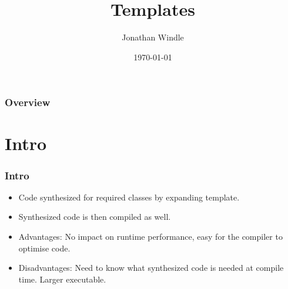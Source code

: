 \documentclass{beamer}
\title[Templates]{Templates} %
\author{Jonathan Windle} %
\institute[UEA] %
{
University of East Anglia \\ %
\medskip
\textit{J.Windle@uea.ac.uk} %
}
\date{\today} %
\begin{document}
\begin{frame}
\titlepage %
\end{frame}

\begin{frame}[allowframebreaks]
\frametitle{Overview} %
\tableofcontents %
\end{frame}

\section{Intro}
\begin{frame}
\frametitle{Intro}
\begin{itemize}
\item Code synthesized for required classes by expanding template.
\item Synthesized code is then compiled as well.
\item Advantages: No impact on runtime performance, easy for the compiler to optimise code.
\item Disadvantages: Need to know what synthesized code is needed at compile time. Larger executable.
\end{itemize}
\end{frame}

\end{document}
